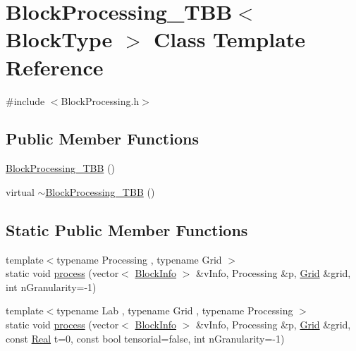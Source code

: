 \hypertarget{class_block_processing___t_b_b}{}\section{Block\+Processing\+\_\+\+T\+B\+B$<$ Block\+Type $>$ Class Template Reference}
\label{class_block_processing___t_b_b}


{\ttfamily \#include $<$Block\+Processing.\+h$>$}

\subsection*{Public Member Functions}
\begin{DoxyCompactItemize}
\item 
\hyperlink{class_block_processing___t_b_b_a1a3d202984fe1c763a1d3a60ed1c8da8}{Block\+Processing\+\_\+\+T\+B\+B} ()
\item 
virtual \hyperlink{class_block_processing___t_b_b_a00a2d6deca06bc723a0e6fbffc0a3a6c}{$\sim$\+Block\+Processing\+\_\+\+T\+B\+B} ()
\end{DoxyCompactItemize}
\subsection*{Static Public Member Functions}
\begin{DoxyCompactItemize}
\item 
{\footnotesize template$<$typename Processing , typename Grid $>$ }\\static void \hyperlink{class_block_processing___t_b_b_afb4ac5aee8af3d4e9f3a0f572bdd0a04}{process} (vector$<$ \hyperlink{struct_block_info}{Block\+Info} $>$ \&v\+Info, Processing \&p, \hyperlink{class_grid}{Grid} \&grid, int n\+Granularity=-\/1)
\item 
{\footnotesize template$<$typename Lab , typename Grid , typename Processing $>$ }\\static void \hyperlink{class_block_processing___t_b_b_a19d9699a50fba9a15eca0e0e1a7f1efd}{process} (vector$<$ \hyperlink{struct_block_info}{Block\+Info} $>$ \&v\+Info, Processing \&p, \hyperlink{class_grid}{Grid} \&grid, const \hyperlink{_h_d_f5_dumper_8h_a445a5f0e2a34c9d97d69a3c2d1957907}{Real} t=0, const bool tensorial=false, int n\+Granularity=-\/1)
\end{DoxyCompactItemize}
